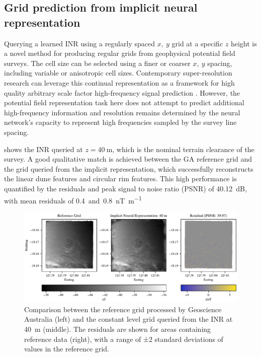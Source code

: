 \subsection{Grid prediction from implicit neural representation}
Querying a learned INR using a regularly spaced \(x,\ y\) grid at a specific \(z\) height is a novel method for producing regular grids from geophysical potential field surveys.
The cell size can be selected using a finer or coarser \(x,\ y\) spacing, including variable or anisotropic cell sizes.
Contemporary super-resolution research can leverage this continual representation as a framework for high quality arbitrary scale factor high-frequency signal prediction \parencite[e.g][]{chenLearningContinuousImage2021}.
However, the potential field representation task here does not attempt to predict additional high-frequency information and resolution remains determined by the neural network's capacity to represent high frequencies sampled by the survey line spacing.

 shows the INR queried at \(z=\qty{40}{\m}\), which is the nominal terrain clearance of the survey.
A good qualitative match is achieved between the GA reference grid and the grid queried from the implicit representation, which successfully reconstructs the linear dune features and circular rim features.
This high performance is quantified by the residuals and peak signal to noise ratio (PSNR) of \qty{40.12}{\dB}, with mean residuals of \qty{0.4} and \qty{0.8}{\nano\tesla\per\m}

\begin{figure}[hbtp]
    \centering
    \includegraphics[width=1.0\linewidth]{fig/p3/P864_grid_comparison_40m.pdf}
    \caption[Grid prediction at the nominal altitude]{Comparison between the reference grid processed by Geoscience Australia (left) and the constant level grid queried from the INR at \qty{40}{\m} (middle). The residuals are shown for areas containing reference data (right), with a range of ±2 standard deviations of values in the reference grid.}
    \label{fig:grid40}
\end{figure}

